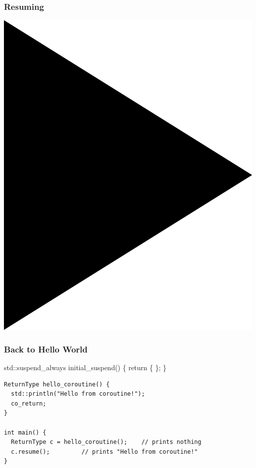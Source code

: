 \documentclass[aspectratio=169]{beamer}
\begin{document}
\begin{frame}

  \frametitle{Resuming}
  
  \begin{center}
  \includegraphics[height=.75\textheight]{corogfx/icon_play.png}
  \end{center}

\end{frame}

\begin{frame}[fragile]

  \frametitle{Back to Hello World}

  \begin{semiverbatim}
\alert<1>{std::suspend_always} initial_suspend() \{ return \{ \}; \}
  \end{semiverbatim}

  \begin{lstlisting}[style=cpp20]
ReturnType hello_coroutine() {
  std::println("Hello from coroutine!");
  co_return;
}

int main() {
  ReturnType c = hello_coroutine();    // prints nothing
  c.resume();         // prints "Hello from coroutine!"
}
\end{lstlisting}

\end{frame}
\end{document}
